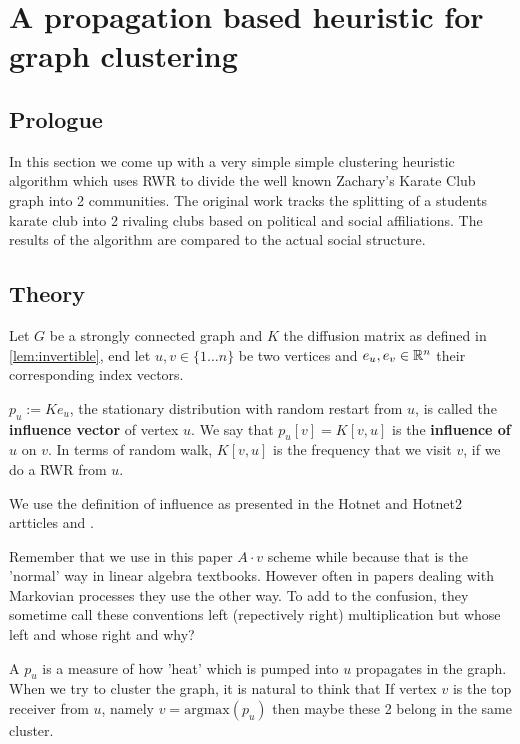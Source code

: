 \section{A propagation based heuristic for graph clustering}

\subsection*{Prologue}
In this section we come up with a very simple simple clustering
heuristic algorithm which uses RWR to divide the well known Zachary's Karate
Club graph into 2 communities.
The original work tracks the splitting of a students karate club into 2 rivaling
clubs based on political and social affiliations.
The results of the algorithm are compared to the actual
social structure.

\subsection*{Theory}

\begin{mydef}
\label{def:influence}
Let $G$ be a strongly connected graph and $K$ the diffusion matrix as defined in
\ref{lem:invertible}, end let $u,v \in \{1 \dots n\}$ be two vertices and $e_u,
e_v \in \mathbb{R}^n$ their corresponding index vectors.

$p_u := K e_u$, the stationary distribution with random restart from $u$,
is called the \textbf{influence vector} of vertex $u$. We say that
$p_u[v] = K[v,u]$
is the \textbf{influence of} $u$ on $v$. In terms of random walk,
$K[v,u]$ is the frequency that we visit $v$, if we do a RWR from
$u$. 
\end{mydef}

\begin{remark}
\label{rem:influence}
We use the definition of influence as presented in the Hotnet and
Hotnet2 artticles \cite{vandin2012discovery} and
\cite{leiserson2015pan}.

Remember that we use in this paper $A \cdot v$ scheme while
because that is the 'normal' way in linear algebra textbooks.
However often in papers dealing with Markovian processes they use
the other way. To add to the confusion, they sometime call these conventions
left (repectively right) multiplication but whose left and whose
right and why?
\end{remark}

A $p_u$ is a measure of how 'heat' which is pumped into $u$ propagates in the graph.
When we try to cluster the graph, it is natural to think that If vertex $v$
is the top receiver from $u$, namely $v = \text{argmax}(p_u)$ then maybe these 2
belong in the same cluster.

